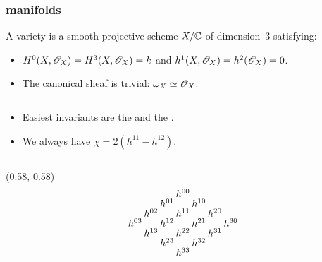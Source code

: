 \begin{frame}
\frametitle{\CY manifolds}

\begin{definition}%
    A \alert{\CY variety} is a smooth projective scheme $X/\mathbb{C}$ of dimension~$3$ satisfying:
    \begin{itemize}
    	\item
	    $H^0(X,\mathscr{O}_X)=H^3(X,\mathscr{O}_X)=k$ and $h^1(X,\mathscr{O}_X)=h^2(\mathscr{O}_X)=0$.

	    \item
	    The canonical sheaf is trivial: $\omega_X \simeq \mathscr{O}_X$. 
    \end{itemize}
\end{definition}

\unskip
\begin{columns}[onlytextwidth]
    \begin{column}{0.6\textwidth}
        \begin{itemize}
	        \item
	        Easiest invariants are the  and the .

            \item
            We always have $\chi = 2(h^{11}-h^{12})$. 
        \end{itemize}
    \end{column}
\end{columns}

{
    \begin{textblock}{0.4}(0.58, 0.58)
        \[
            \arraycolsep = 1pt
            \def\arraystretch{0.5}
            \begin{array}[c]{ccccccc}
                &&& h^{00}                               \\  
                &&  h^{01} && h^{10}                     \\
                &   h^{02} && h^{11} && h^{20}           \\
                    h^{03} && h^{12} && h^{21} && h^{30} \\
                &   h^{13} && h^{22} && h^{31}           \\
                &&  h^{23} && h^{32}                     \\
                &&& h^{33} 
            \end{array}
        \]  
    \end{textblock}
}


\end{frame}
